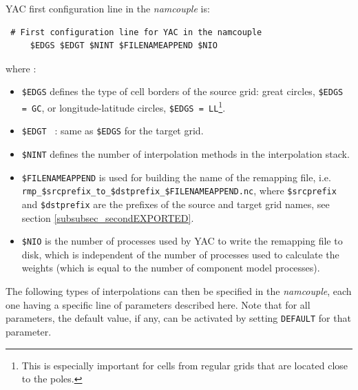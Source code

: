 YAC first configuration line in the {\it namcouple} is: 
\begin{verbatim}
 # First configuration line for YAC in the namcouple
     $EDGS $EDGT $NINT $FILENAMEAPPEND $NIO
\end{verbatim} 
where :
\begin{itemize}
\item {\tt \$EDGS} defines the type of cell borders of the source grid: great circles, {\tt \$EDGS = GC}, or longitude-latitude circles, {\tt \$EDGS = LL}\footnote{This is especially important for cells from regular grids that are located close to the poles.}.
\item {\tt  \$EDGT } : same as {\tt \$EDGS} for the target grid.
\item {\tt \$NINT} defines the number of interpolation methods in the interpolation stack.
\item {\tt \$FILENAMEAPPEND} is used for building the name of the remapping file, \newline i.e. {\tt rmp\_\$srcprefix\_to\_\$dstprefix\_\$FILENAMEAPPEND.nc}, where {\tt \$srcprefix} and  {\tt \$dstprefix} are the prefixes of the source and target grid names, see section \ref{subsubsec_secondEXPORTED}.
\item {\tt \$NIO} is the number of processes used by YAC to write the remapping file to disk, which is independent of the number of processes used to calculate the weights (which is equal to the number of component model processes).
\end{itemize}

The following types of interpolations can then be specified in the {\it namcouple}, each one having a specific line of parameters described here. Note that for all parameters, the default value, if any, can be activated by setting {\tt DEFAULT} for that parameter.

